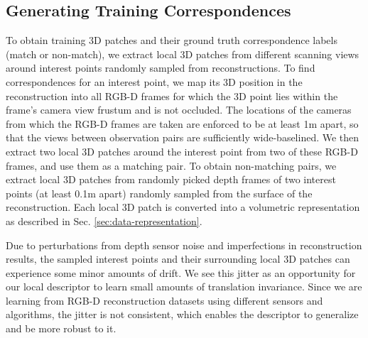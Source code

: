 \documentclass[10pt,twocolumn,letterpaper]{article}
\begin{document}
\subsection{Generating Training Correspondences} 
To obtain training 3D patches and their ground truth correspondence labels (match or non-match), we extract local 3D patches from different scanning views around interest points randomly sampled from reconstructions.
To find correspondences for an interest point, we map its 3D position in the reconstruction into all RGB-D frames for which the 3D point lies within the frame's camera view frustum and is not occluded.
The locations of the cameras from which the RGB-D frames are taken are enforced to be at least 1m apart, so that the views between observation pairs are sufficiently wide-baselined.  
We then extract two local 3D patches around the interest point from two of these RGB-D frames, and use them as a matching pair. 
To obtain non-matching pairs, we extract local 3D patches from randomly picked depth frames of two interest points (at least 0.1m apart) randomly sampled from the surface of the reconstruction. 
Each local 3D patch is converted into a volumetric representation as described in Sec. \ref{sec:data-representation}.%

Due to perturbations from depth sensor noise and imperfections in reconstruction results, the sampled interest points and their surrounding local 3D patches can experience some minor amounts of drift. We see this jitter as an opportunity for our local descriptor to learn small amounts of translation invariance.
Since we are learning from RGB-D reconstruction datasets using different sensors and algorithms, the jitter is not consistent, which enables the descriptor to generalize and be more robust to it.





  
\end{document}
